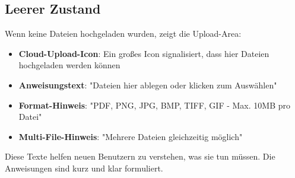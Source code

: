 \subsection{Leerer Zustand}

Wenn keine Dateien hochgeladen wurden, zeigt die Upload-Area:

\begin{itemize}
    \item \textbf{Cloud-Upload-Icon}: Ein großes Icon signalisiert, dass hier Dateien hochgeladen werden können
    \item \textbf{Anweisungstext}: "Dateien hier ablegen oder klicken zum Auswählen"
    \item \textbf{Format-Hinweis}: "PDF, PNG, JPG, BMP, TIFF, GIF - Max. 10MB pro Datei"
    \item \textbf{Multi-File-Hinweis}: "Mehrere Dateien gleichzeitig möglich"
\end{itemize}

Diese Texte helfen neuen Benutzern zu verstehen, was sie tun müssen. Die Anweisungen sind kurz und klar formuliert.
